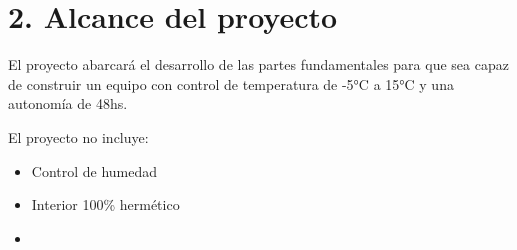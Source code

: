 \section{2. Alcance del proyecto}
\label{sec:alcance}

\quad El proyecto abarcará el desarrollo de las partes fundamentales para que sea capaz de construir un equipo con control de temperatura de -5°C a 15°C y una autonomía de 48hs.

El proyecto no incluye:
\begin{itemize}
  \item Control de humedad
  \item Interior 100\% hermético
  \item 
\end{itemize}